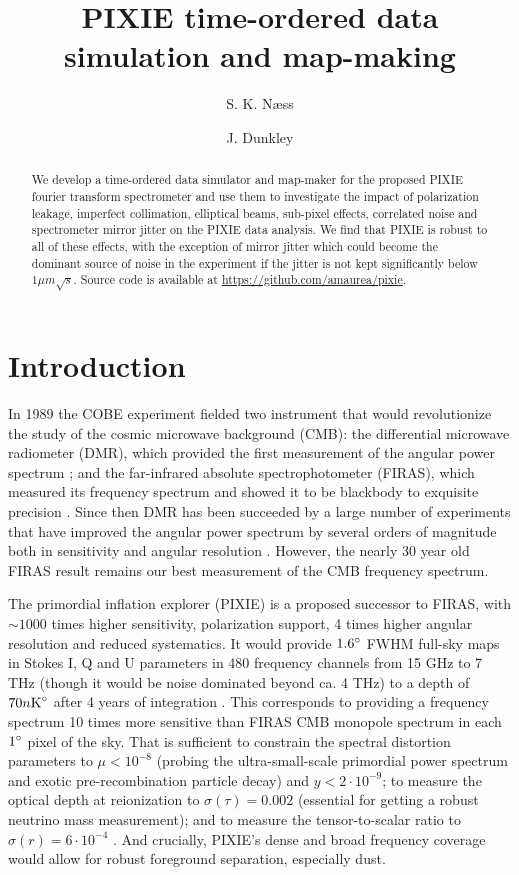 \documentclass{article}
\title{PIXIE time-ordered data simulation and map-making}
\author[1,3]{S. K. Næss}
\author[2,3]{J. Dunkley}
\affil[1]{Center for Computational Astrophysics, Flatiron Institute}
\affil[2]{Princeton University}
\affil[3]{Oxford University}
\begin{document}
\maketitle
\begin{abstract}
	We develop a time-ordered data simulator and map-maker for the
	proposed PIXIE fourier transform spectrometer and use them to
	investigate the impact of polarization leakage, imperfect collimation,
	elliptical beams, sub-pixel effects, correlated noise and
	spectrometer mirror jitter on the PIXIE data analysis. We find
	that PIXIE is robust to all of these effects, with the exception
	of mirror jitter which could become the dominant source of noise
	in the experiment if the jitter is not kept significantly below
	$1\mu m\sqrt{s}$. Source code is available at \url{https://github.com/amaurea/pixie}.
\end{abstract}

\section{Introduction}
In 1989 the COBE experiment fielded two instrument that would revolutionize the
study of the cosmic microwave background (CMB): the differential microwave
radiometer (DMR), which provided the first measurement of the angular power
spectrum \citep{cobe-dmr-1992}; and the far-infrared absolute spectrophotometer (FIRAS), which
measured its frequency spectrum and showed it to be blackbody to exquisite
precision \citep{cobe-firas-1996}. Since then DMR has been succeeded by a large number of experiments
that have improved the angular power spectrum by several orders of magnitude
both in sensitivity and angular resolution \citep{bennett/etal/2013, planck_mission/2013, bicep2-planck, act-2017, spt-2017}. However, the nearly 30 year old
FIRAS result remains our best measurement of the CMB frequency spectrum.

The primordial inflation explorer (PIXIE) is a proposed successor to FIRAS,
with $\sim 1000$ times higher sensitivity, polarization support, 4 times
higher angular resolution and reduced systematics.
It would provide $1.6\degree$ FWHM full-sky maps in Stokes I, Q and U parameters
in 480 frequency channels from 15 GHz to 7 THz (though it would be noise dominated
beyond ca. 4 THz) to a depth of $70n\textrm{K}\degree$ after 4 years of integration
\citep{pixie2011}. This corresponds to providing a frequency spectrum 10 times more
sensitive than FIRAS CMB monopole spectrum in each $1\degree$ pixel of the sky.
That is sufficient to constrain the spectral distortion parameters to $\mu < 10^{-8}$
(probing the ultra-small-scale primordial power spectrum and exotic pre-recombination
particle decay) and $y < 2\cdot 10^{-9}$; to measure the optical depth at reionization
to $\sigma(\tau) = 0.002$ (essential for getting a robust neutrino mass measurement);
and to measure the tensor-to-scalar ratio to $\sigma(r) = 6\cdot 10^{-4}$ \citep{pixie-s4}.
And crucially, PIXIE's dense and broad frequency coverage would allow for robust
foreground separation, especially dust.
\end{document}
